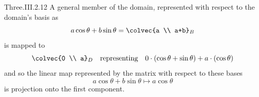 \begin{ans}{Three.III.2.12}
      A general member of the domain, represented with respect to the
      domain's basis as
      \begin{equation*}
        a\cos\theta+b\sin\theta=\colvec{a \\ a+b}_B
      \end{equation*}
      is mapped to
      \begin{equation*}
        \colvec{0 \\ a}_D
          \quad\text{representing}\quad
        0\cdot(\cos\theta+\sin\theta)+a\cdot(\cos\theta)
      \end{equation*}
      and so the linear map represented by the matrix with respect to these
      bases
      \begin{equation*}
        a\cos\theta+b\sin\theta
            \mapsto
        a\cos\theta
      \end{equation*}
      is projection onto the first component.
    
\end{ans}
